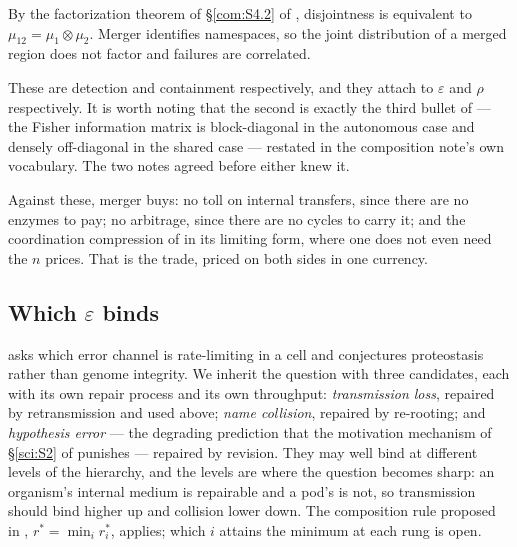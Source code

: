 \begin{proposition}\label{eng:merger-destroys-independence}
By the factorization theorem of \S\ref{com:S4.2} of \chComp, disjointness is
equivalent to $\mu_{12} = \mu_1 \otimes \mu_2$. Merger identifies
namespaces, so the joint distribution of a merged region does not factor
and failures are correlated.
\end{proposition}

These are detection and containment respectively, and they attach to
$\varepsilon$ and $\rho$ respectively. It is worth noting that the second
is exactly the third bullet of \cite[\S1]{compaut} --- the Fisher
information matrix is block-diagonal in the autonomous case and densely
off-diagonal in the shared case --- restated in the composition note's own
vocabulary. The two notes agreed before either knew it.

Against these, merger buys: no toll on internal transfers, since there are
no enzymes to pay; no arbitrage, since there are no cycles to carry it; and
the coordination compression of \cite[\S5]{vtok} in its limiting form,
where one does not even need the $n$ prices. That is the trade, priced on
both sides in one currency.

\subsection{Which $\varepsilon$ binds}\label{eng:S8.6}
\label{eng:sec:whicheps}

\cite{compaut} asks which error channel is rate-limiting in a cell and
conjectures proteostasis rather than genome integrity. We inherit the
question with three candidates, each with its own repair process and its
own throughput: \emph{transmission loss}, repaired by retransmission and
used above; \emph{name collision}, repaired by re-rooting; and
\emph{hypothesis error} --- the degrading prediction that the motivation
mechanism of \S\ref{sci:S2} of \chSci punishes --- repaired by revision. They
may well bind at different levels of the hierarchy, and the levels are
where the question becomes sharp: an organism's internal medium is
repairable and a pod's is not, so transmission should bind higher up and
collision lower down. The composition rule proposed in \cite{compaut},
$r^\ast = \min_i r^\ast_i$, applies; which $i$ attains the minimum at each
rung is open.

